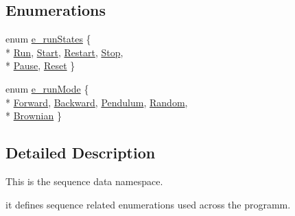 \subsection*{Enumerations}
\begin{DoxyCompactItemize}
\item 
enum \hyperlink{namespaceSequenceEnum_ac7ea8369c971b81acfe5a1d63a10ebe3}{e\-\_\-run\-States} \{ \\*
\hyperlink{namespaceSequenceEnum_ac7ea8369c971b81acfe5a1d63a10ebe3aba765510708832ec607eb5916f07fd35}{Run}, 
\hyperlink{namespaceSequenceEnum_ac7ea8369c971b81acfe5a1d63a10ebe3aa9ca5b61780cadeed0d5963095fe5db5}{Start}, 
\hyperlink{namespaceSequenceEnum_ac7ea8369c971b81acfe5a1d63a10ebe3aa277d3642c16a5f3597cf49ff021abff}{Restart}, 
\hyperlink{namespaceSequenceEnum_ac7ea8369c971b81acfe5a1d63a10ebe3a9a4e6acbff3104211a16c87ebe5b7a58}{Stop}, 
\\*
\hyperlink{namespaceSequenceEnum_ac7ea8369c971b81acfe5a1d63a10ebe3ac384cac9192fd9e1def2767b7e7620d4}{Pause}, 
\hyperlink{namespaceSequenceEnum_ac7ea8369c971b81acfe5a1d63a10ebe3aac7d742b92696400bf6ebb628a934bf4}{Reset}
 \}
\item 
enum \hyperlink{namespaceSequenceEnum_a2241436a1b94492d5f8df2f01a858857}{e\-\_\-run\-Mode} \{ \\*
\hyperlink{namespaceSequenceEnum_a2241436a1b94492d5f8df2f01a858857a680c3bf17dd73fb62741d87a04f98003}{Forward}, 
\hyperlink{namespaceSequenceEnum_a2241436a1b94492d5f8df2f01a858857af792bbd5445c7cae1c3132f15be51bb3}{Backward}, 
\hyperlink{namespaceSequenceEnum_a2241436a1b94492d5f8df2f01a858857a6e24874edb554db76221d23abba33793}{Pendulum}, 
\hyperlink{namespaceSequenceEnum_a2241436a1b94492d5f8df2f01a858857aa496073028085d359012beb35fbfbd5a}{Random}, 
\\*
\hyperlink{namespaceSequenceEnum_a2241436a1b94492d5f8df2f01a858857a0d9f27ad3750aba023a973ead8dbecb8}{Brownian}
 \}
\end{DoxyCompactItemize}


\subsection{Detailed Description}
This is the sequence data namespace.\par
 it defines sequence related enumerations used across the programm. 


